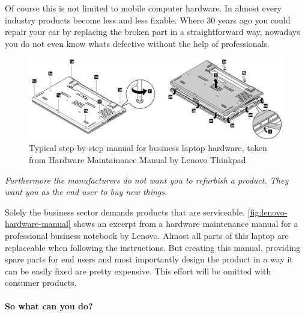 	Of course this is not limited to mobile computer hardware. In almost every industry products become less and less fixable. Where 30 years ago you could repair your car by replacing the broken part in a straightforward way, nowadays you do not even know whats defective without the help of professionals.
	
	\begin{figure}[H]
		\includegraphics[width=\textwidth]{../images/common-manual.png}
		\centering
		\caption[Typical step-by-step manual for business laptop hardware, taken from Hardware Maintainance Manual by Lenovo Thinkpad]{Typical step-by-step manual for business laptop hardware, taken from Hardware Maintainance Manual by Lenovo Thinkpad\footnotemark}
		\label{fig:lenovo-hardware-manual}
	\end{figure}
	
	\textit{Furthermore the manufacturers do not want you to refurbish a product. They want you as the end user to buy new things.}
	
	Solely the business sector demands products that are serviceable. \autoref{fig:lenovo-hardware-manual} shows an excerpt from a hardware maintenance manual for a professional business notebook by Lenovo. Almost all parts of this laptop are replaceable when following the instructions. But creating this manual, providing spare parts for end users and most importantly design the product in a way it can be easily fixed are pretty expensive. This effort will be omitted with consumer products.
	
	\paragraph{So what can you do?}

